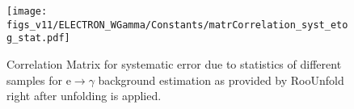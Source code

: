 \begin{figure}[htb]
  \begin{center}
\texttt{[image: figs\_v11/ELECTRON\_WGamma/Constants/matrCorrelation\_syst\_etog\_stat.pdf]}
  \caption{Correlation Matrix for systematic error due to statistics of different samples for e$\rightarrow\gamma$ background estimation as provided by RooUnfold right after unfolding is applied.}
  \label{fig:corrMatrices_syst_etog_stat_Wg}
  \end{center}
\end{figure}

